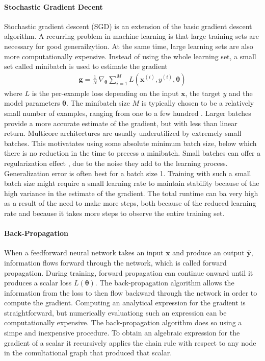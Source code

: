 \documentclass{scrartcl}
\begin{document}
\paragraph{Stochastic Gradient Decent}
Stochastic gradient descent (SGD) is an extension of the basic gradient descent algorithm. A recurring problem in machine learning is that large training sets are necessary for good generailzytion. At the same time, large learning sets are also more computationally expensive. Instead of using the whole learning set, a small set called minibatch is used to estimate the gradient
\begin{align}
\mathbf g = \frac{1}{N} \,\nabla_{\boldsymbol \theta} \sum_{i=1}^M L(\mathbf x^{(i)}, y^{(i)}, \boldsymbol \theta)
\end{align}  
where $L$ is the per-example loss depending on the input $\mathbf x$, the target $y$ and the model parameters $\boldsymbol \theta$. The minibatch size $M$ is typically chosen to be a relatively small number of examples, ranging from one to a few hundred \cite{Goodfellow2016}. Larger batches provide a more accurate estimate of the gradient, but with less than linear return. Multicore architectures are usually underutilized by extremely small batches. This motivatates using some absolute minimum batch size, below which there is no reduction in the time to precess a minibatch. Small batches can offer a regularization effect \cite{Wilson2003}, due to the noise they add to the learning process. Generalization error is often best for a batch size 1. Training with such a small batch size might require a small learning rate to maintain stability because of the high variance in the estimate of the gradient. The total runtime can ba very high as a result of the need to make more steps, both because of the reduced learning rate and because it takes more steps to observe the entire training set. 

\paragraph{Back-Propagation}
When a feedforward neural network takes an input $\mathbf x$ and produce an output $\hat{\mathbf y}$, information flows forward through the network, which is called forward propagation. During training, forward propagation can continue onward until it produces a scalar loss $L(\boldsymbol \theta)$. The back-propagation algorithm \cite{Rumelhart1988} allows the information from the loss to then flow backward through the network in order to compute the gradient. Computing an analytical expression for the gradient is straightforward, but numerically evaluationg such an expression can be computationally expensive. The back-propagation algorithm does so using a simpe and inexpensive procedure. To obtain an algebraic expression for the gradient of a scalar it recursively applies the chain rule with respect to any node in the comultational graph that produced that scalar. 
\end{document}
